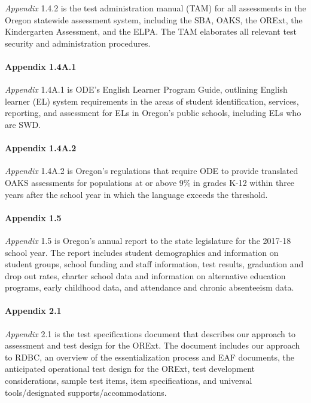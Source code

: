 \documentclass[]{article}
\let\oldparagraph\paragraph
\renewcommand{\paragraph}[1]{\oldparagraph{#1}\mbox{}}
\begin{document}
\emph{Appendix} 1.4.2 is the test administration manual (TAM) for all
assessments in the Oregon statewide assessment system, including the
SBA, OAKS, the ORExt, the Kindergarten Assessment, and the ELPA. The TAM
elaborates all relevant test security and administration procedures.

\hypertarget{appendix-1.4a.1}{%
\paragraph{Appendix 1.4A.1}\label{appendix-1.4a.1}}

\emph{Appendix} 1.4A.1 is ODE's English Learner Program Guide, outlining
English learner (EL) system requirements in the areas of student
identification, services, reporting, and assessment for ELs in Oregon's
public schools, including ELs who are SWD.

\hypertarget{appendix-1.4a.2}{%
\paragraph{Appendix 1.4A.2}\label{appendix-1.4a.2}}

\emph{Appendix} 1.4A.2 is Oregon's regulations that require ODE to
provide translated OAKS assessments for populations at or above 9\% in
grades K-12 within three years after the school year in which the
language exceeds the threshold.

\hypertarget{appendix-1.5}{%
\paragraph{Appendix 1.5}\label{appendix-1.5}}

\emph{Appendix} 1.5 is Oregon's annual report to the state legislature
for the 2017-18 school year. The report includes student demographics
and information on student groups, school funding and staff information,
test results, graduation and drop out rates, charter school data and
information on alternative education programs, early childhood data, and
attendance and chronic absenteeism data.

\hypertarget{appendix-2.1}{%
\paragraph{Appendix 2.1}\label{appendix-2.1}}

\emph{Appendix} 2.1 is the test specifications document that describes
our approach to assessment and test design for the ORExt. The document
includes our approach to RDBC, an overview of the essentialization
process and EAF documents, the anticipated operational test design for
the ORExt, test development considerations, sample test items, item
specifications, and universal tools/designated supports/accommodations.
\end{document}
